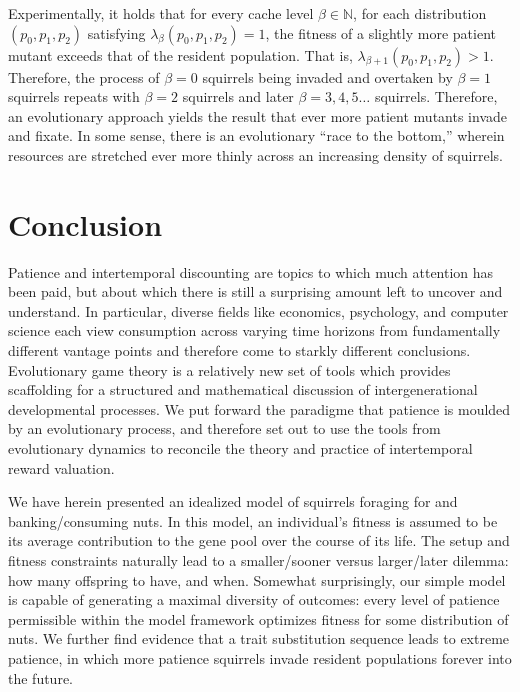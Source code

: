 \documentclass[titlepage, hidelinks, 12pt]{article}
\theoremstyle{plain}
\theoremstyle{remark}
\theoremstyle{definition}
\newcommand{\N}{\mathbb{N}}
\begin{document}
Experimentally, it holds that for every cache level $\beta\in\N$, for each distribution $(p_0, p_1, p_2)$ satisfying $\lambda_\beta(p_0, p_1, p_2) = 1$,
the fitness of a slightly more patient mutant exceeds that of the resident population. That is, $\lambda_{\beta+1}(p_0, p_1, p_2) > 1$. Therefore,
the process of $\beta = 0$ squirrels being invaded and overtaken by $\beta = 1$ squirrels repeats with $\beta = 2$ squirrels and later 
$\beta = 3, 4, 5\ldots$ squirrels. Therefore, an evolutionary approach yields the result that ever more patient mutants invade and fixate. In some
sense, there is an evolutionary ``race to the bottom,'' wherein resources are stretched ever more thinly across an increasing density
of squirrels. 






\section{Conclusion}

Patience and intertemporal discounting are topics to which much attention has been paid, but about which there is still a surprising amount
left to uncover and understand. In particular, diverse fields like economics, psychology, and computer science each view consumption across
varying time horizons from fundamentally different vantage points and therefore come to starkly different conclusions. 
Evolutionary game theory is a relatively new set of tools which provides scaffolding for a structured and mathematical discussion of 
intergenerational developmental processes. 
We put forward the paradigme that patience is moulded by an evolutionary process, and therefore set out to use the tools from evolutionary
dynamics to reconcile the theory and practice of intertemporal reward valuation. 

We have herein presented an idealized model of squirrels foraging for and banking/consuming nuts. In this model, an individual's fitness
is assumed to be its average contribution to the gene pool over the course of its life. The setup and fitness constraints naturally lead to a
smaller/sooner versus larger/later dilemma: how many offspring to have, and when. Somewhat surprisingly,
our simple model is capable of generating a maximal diversity of outcomes: every level of patience permissible within the model framework 
optimizes fitness for some distribution of nuts. We further find evidence that a trait substitution sequence leads to extreme patience,
in which more patience squirrels invade resident populations forever into the future. 
\end{document}
